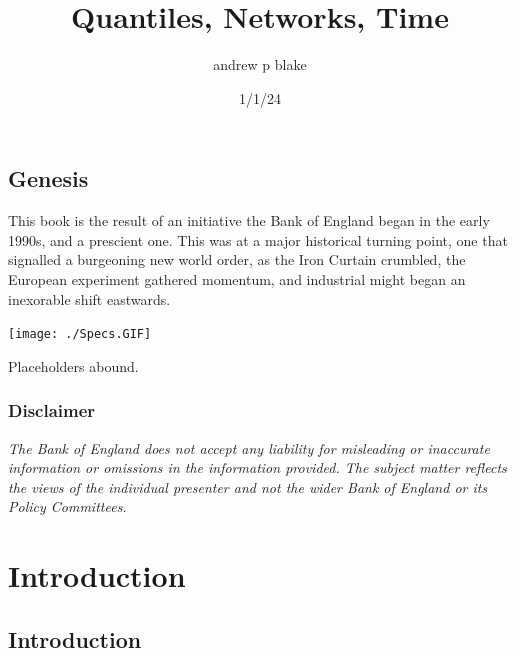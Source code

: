 \documentclass[
  letterpaper,
]{book}
\title{Quantiles, Networks, Time}
\author{andrew p blake}
\date{1/1/24}
\renewcommand*\contentsname{Table of contents}
\newcommand\contentsname{Table of contents}
\begin{document}
\frontmatter
\maketitle
\ifdefined\Shaded\renewenvironment{Shaded}{\begin{tcolorbox}[enhanced, interior hidden, boxrule=0pt, borderline west={3pt}{0pt}{shadecolor}, breakable, sharp corners, frame hidden]}{\end{tcolorbox}}\fi

\renewcommand*\contentsname{Table of contents}
{
\setcounter{tocdepth}{2}
\tableofcontents
}
\mainmatter
{}

\hypertarget{sec-genesis}{%
\chapter*{Genesis}\label{sec-genesis}}


This book is the result of an initiative the Bank of England began in
the early 1990s, and a prescient one. This was at a major historical
turning point, one that signalled a burgeoning new world order, as the
Iron Curtain crumbled, the European experiment gathered momentum, and
industrial might began an inexorable shift eastwards.

\texttt{[image: ./Specs.GIF]}

Placeholders abound.

\hypertarget{sec-disclaimer}{%
\section*{Disclaimer}\label{sec-disclaimer}}


\emph{The Bank of England does not accept any liability for misleading
or inaccurate information or omissions in the information provided. The
subject matter reflects the views of the individual presenter and not
the wider Bank of England or its Policy Committees.}

\part{Introduction}

\hypertarget{introduction-1}{%
\chapter{Introduction}\label{introduction-1}}
\end{document}
